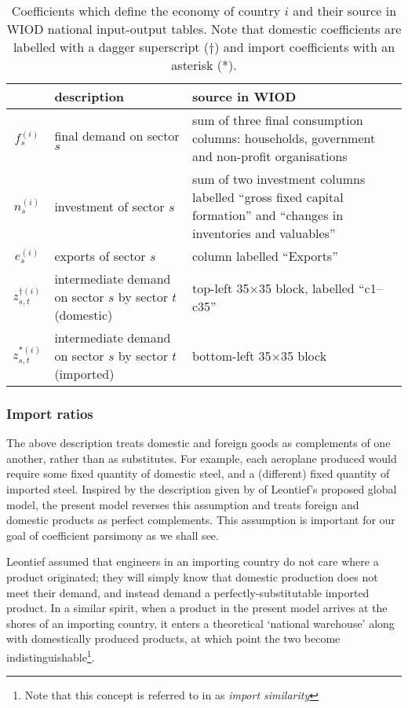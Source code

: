 \documentclass[a4paper]{article}
\begin{document}
\begin{table}
    \centering
    \caption{Coefficients which define the economy of country $i$ and their source in WIOD national input-output tables. Note that domestic coefficients are labelled with a dagger superscript ($\dagger$) and import coefficients with an asterisk (*).}\label{tbl:cvars}
    \begin{tabular}{cp{3.7cm}p{6.5cm}}
        \toprule
        & description  & source in WIOD \\ \midrule
        $f_s^{(i)}$ & final demand on sector $s$  & sum of three final consumption columns:
        households, government and non-profit organisations \\
        $n_s^{(i)}$ & investment of sector $s$ & sum of two investment columns labelled
        ``gross fixed capital formation'' and
        ``changes in inventories and valuables'' \\
        $e_s^{(i)}$ & exports of sector $s$ & column labelled ``Exports'' \\
        $z_{s,t}^{\dagger(i)}$ & intermediate demand on 
        sector $s$ by sector $t$ \mbox{(domestic)}& top-left 35$\times$35 block, labelled ``c1--c35'' \\
        $z_{s,t}^{*(i)}$ & intermediate demand on 
        sector $s$ by sector $t$ \mbox{(imported)}& bottom-left 35$\times$35 block
        \\\bottomrule
    \end{tabular}
\end{table}

\subsubsection*{Import ratios}\label{sec:importratios}

The above description treats domestic and foreign goods as complements of one another, rather than as substitutes.
For example, each aeroplane produced would require some fixed quantity of domestic steel, and a (different) fixed quantity of imported steel.
Inspired by the description given by \textcite{duchin_international_2004} of Leontief's proposed global model, the present model reverses this assumption and treats foreign and domestic products as perfect complements.
This assumption is important for our goal of coefficient parsimony as we shall see.

Leontief assumed that engineers in an importing country do not care where a product originated; they will simply know that domestic production does not meet their demand, and instead demand a perfectly-substitutable imported product.
In a similar spirit, when a product in the present model arrives at the shores of an importing country, it enters a theoretical `national warehouse' along with domestically produced products, at which point the two become indistinguishable\footnote{Note that this concept is referred to in \textcite{miller_input-output_1985} as \textit{import similarity}}.
\end{document}
